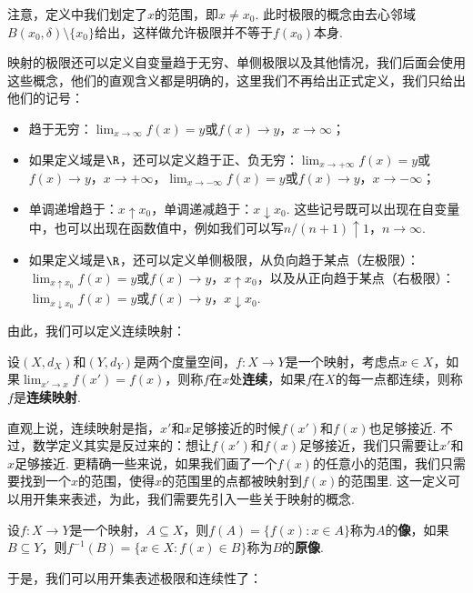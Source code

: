 注意，定义中我们划定了$x$的范围，即$x\neq x_0$. 此时极限的概念由去心邻域$B(x_0,\delta)\setminus\{x_0\}$给出，这样做允许极限并不等于$f(x_0)$本身. 

\begin{remark}
映射的极限还可以定义自变量趋于无穷、单侧极限以及其他情况，我们后面会使用这些概念，他们的直观含义都是明确的，这里我们不再给出正式定义，我们只给出他们的记号：
\begin{itemize}
    \item 趋于无穷：$\lim_{x\to\infty}f(x)=y$或$f(x)\to y$，$x\to\infty$；
    \item 如果定义域是$\R$，还可以定义趋于正、负无穷：$\lim_{x\to+\infty}f(x)=y$或$f(x)\to y$，$x\to+\infty$，$\lim_{x\to-\infty}f(x)=y$或$f(x)\to y$，$x\to-\infty$；
    \item 单调递增趋于：$x\uparrow x_0$，单调递减趋于：$x\downarrow x_0$. 这些记号既可以出现在自变量中，也可以出现在函数值中，例如我们可以写$n/(n+1)\uparrow 1$，$n\to\infty$.
    \item 如果定义域是$\R$，还可以定义单侧极限，从负向趋于某点（左极限）：$\lim_{x\uparrow x_0}f(x)=y$或$f(x)\to y$，$x\uparrow x_0$，以及从正向趋于某点（右极限）：$\lim_{x\downarrow x_0}f(x)=y$或$f(x)\to y$，$x\downarrow x_0$.
\end{itemize}
\end{remark}

由此，我们可以定义连续映射：
\begin{definition}[连续映射]
    设$(X,d_X)$和$(Y,d_Y)$是两个度量空间，$f:X\to Y$是一个映射，考虑点$x\in X$，如果$\lim_{x'\to x}f(x')=f(x)$，则称$f$在$x$处\textbf{连续}，如果$f$在$X$的每一点都连续，则称$f$是\textbf{连续映射}.
\end{definition}

直观上说，连续映射是指，$x'$和$x$足够接近的时候$f(x')$和$f(x)$也足够接近. 不过，数学定义其实是反过来的：想让$f(x')$和$f(x)$足够接近，我们只需要让$x'$和$x$足够接近. 更精确一些来说，如果我们画了一个$f(x)$的任意小的范围，我们只需要找到一个$x$的范围，使得$x$的范围里的点都被映射到$f(x)$的范围里. 这一定义可以用开集来表述，为此，我们需要先引入一些关于映射的概念. 

\begin{definition}[像，原像]
    设$f:X\to Y$是一个映射，$A\subseteq X$，则$f(A)=\{f(x):x\in A\}$称为$A$的\textbf{像}，如果$B\subseteq Y$，则$f^{-1}(B)=\{x\in X:f(x)\in B\}$称为$B$的\textbf{原像}. 
\end{definition}

于是，我们可以用开集表述极限和连续性了：


